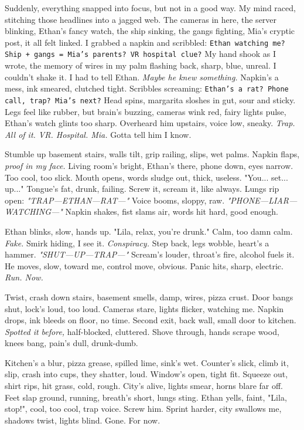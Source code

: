 \documentclass[12pt]{article}
\newcommand{\note}[1]{\texttt{#1}}
\begin{document}
Suddenly, everything snapped into focus, but not in a good way. My mind raced, stitching those headlines into a jagged web. The cameras in here, the server blinking, \textnormal{Ethan}’s fancy watch, the ship sinking, the gangs fighting, \textnormal{Mia}’s cryptic post, it all felt linked. I grabbed a napkin and scribbled: \note{Ethan watching me? Ship + gangs = Mia’s parents? VR hospital clue?} My hand shook as I wrote, the memory of wires in my palm flashing back, sharp, blue, unreal. I couldn’t shake it. I had to tell \textnormal{Ethan}. \textit{Maybe he knew something.} Napkin’s a mess, ink smeared, clutched tight. Scribbles screaming: \note{Ethan’s a rat? Phone call, trap? Mia’s next?} Head spins, margarita sloshes in gut, sour and sticky. Legs feel like rubber, but brain’s buzzing, cameras wink red, fairy lights pulse, \textnormal{Ethan}’s watch glints too sharp. Overheard him upstairs, voice low, sneaky. \textit{Trap. All of it. VR. Hospital. Mia.} Gotta tell him I know.

Stumble up basement stairs, walls tilt, grip railing, slips, wet palms. Napkin flaps, \textit{proof in my face.} Living room’s bright, \textnormal{Ethan}’s there, phone down, eyes narrow. Too cool, too slick. Mouth opens, words sludge out, thick, useless. "You... set... up..." Tongue’s fat, drunk, failing. Screw it, scream it, like always. Lungs rip open: \textit{"TRAP—ETHAN—RAT—"} Voice booms, sloppy, raw. \textit{"PHONE—LIAR—WATCHING—"} Napkin shakes, fist slams air, words hit hard, good enough.

\textnormal{Ethan} blinks, slow, hands up. "Lila, relax, you’re drunk." Calm, too damn calm. \textit{Fake.} Smirk hiding, I see it. \textit{Conspiracy.} Step back, legs wobble, heart’s a hammer. \textit{"SHUT—UP—TRAP—"} Scream’s louder, throat’s fire, alcohol fuels it. He moves, slow, toward me, control move, obvious. Panic hits, sharp, electric. \textit{Run. Now.}

Twist, crash down stairs, basement smells, damp, wires, pizza crust. Door bangs shut, lock’s loud, too loud. Cameras stare, lights flicker, watching me. Napkin drops, ink bleeds on floor, no time. Second exit, back wall, small door to kitchen. \textit{Spotted it before,} half-blocked, cluttered. Shove through, hands scrape wood, knees bang, pain’s dull, drunk-dumb.

Kitchen’s a blur, pizza grease, spilled lime, sink’s wet. Counter’s slick, climb it, slip, crash into cups, they shatter, loud. Window’s open, tight fit. Squeeze out, shirt rips, hit grass, cold, rough. City’s alive, lights smear, horns blare far off. Feet slap ground, running, breath’s short, lungs sting. \textnormal{Ethan} yells, faint, "Lila, stop!", cool, too cool, trap voice. Screw him. Sprint harder, city swallows me, shadows twist, lights blind. Gone. For now.
\end{document}
